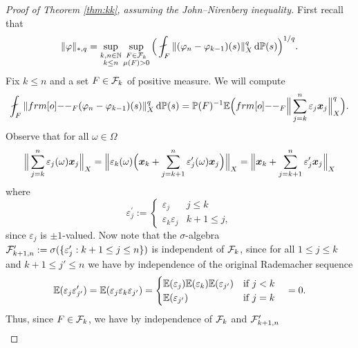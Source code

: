 \begin{proof}[Proof of Theorem \ref{thm:kk}, assuming the John--Nirenberg inequality]
  First recall that
  \begin{equation*}
    \|\phi\|_{*,q} =  \sup_{\substack{k,n \in \N \\ k \leq n}} \sup_{\substack{F \in \mc{F}_k \\ \mu(F) > 0}} \Big( \fint_{F} \|(\phi_n - \phi_{k-1})(s)\|_{X}^{q} \, \dd\P(s)\Big)^{1/q}.
  \end{equation*}
  Fix $k \leq n$ and a set $F \in \mathcal{F}_k$ of positive measure.
  We will compute
  \begin{equation*}
    \fint_{F} \|\1_{F} (\phi_n - \phi_{k-1})(s)\|_{X}^q \, \dd\P(s) = \P(F)^{-1} \E \Big( \1_{F} \Big\| \sum_{j=k}^{n} \varepsilon_j \mb{x}_j\Big\|_{X}^q \Big).
  \end{equation*}
  Observe that for all $\omega \in \Omega$
  \begin{equation*}
    \Big\| \sum_{j=k}^{n} \varepsilon_j(\omega) \bm{x}_j\Big\|_{X} = \Big\| \varepsilon_k(\omega) \Big( \bm{x}_k + \sum_{j=k+1}^{n} \varepsilon_{j}^{\prime}(\omega) \bm{x}_j \Big) \Big\|_{X} = \Big\|\bm{x}_k + \sum_{j=k+1}^{n} \varepsilon_{j}^{\prime} \bm{x}_j \Big\|_{X}
  \end{equation*}
  where
  \begin{equation*}
    \varepsilon_{j}^{\prime} :=
    \begin{cases}
      \varepsilon_{j} & j \leq k \\
      \varepsilon_{k} \varepsilon_{j} & k+1 \leq j,
    \end{cases}
  \end{equation*}
  since $\varepsilon_j$ is $\pm 1$-valued.
  Now note that the $\sigma$-algebra $\mathcal{F}^\prime_{k+1,n} := \sigma(\{\varepsilon_j^\prime : k+1 \leq j \leq n\})$ is independent of $\mathcal{F}_k$, since for all $1 \leq j \leq k$ and $k+1 \leq j' \leq n$ we have by independence of the original Rademacher sequence
  \begin{equation*}
    \mathbb{E}(\varepsilon_j \varepsilon_{j'}^\prime) = \mathbb{E}(\varepsilon_j \varepsilon_k \varepsilon_{j'})
    =
    \begin{cases}
      \mathbb{E}(\varepsilon_j) \mathbb{E}(\varepsilon_k) \mathbb{E}(\varepsilon_{j'}) & \text{if $j < k$} \\
       \mathbb{E}(\varepsilon_{j'}) & \text{if $j = k$}
    \end{cases}
    \quad = 0.
  \end{equation*}
  Thus, since $F \in \mathcal{F}_k$, we have by independence of $\mathcal{F}_k$ and $\mathcal{F}^{\prime}_{k+1, n}$
  \begin{equation*}
    \begin{aligned}

\end{aligned}
\end{equation*}
\end{proof}
